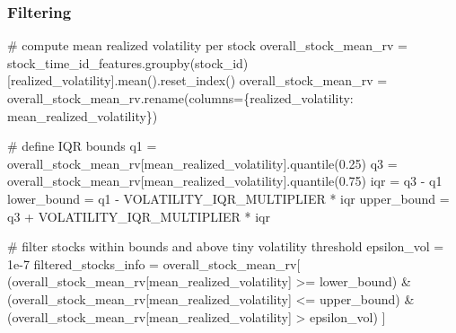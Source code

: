 \documentclass[
  letterpaper,
  DIV=11,
  numbers=noendperiod]{scrartcl}
\newenvironment{Shaded}{\begin{snugshade}}{\end{snugshade}}
\newcommand{\CommentTok}[1]{\textcolor[rgb]{0.37,0.37,0.37}{#1}}
\newcommand{\FloatTok}[1]{\textcolor[rgb]{0.68,0.00,0.00}{#1}}
\newcommand{\NormalTok}[1]{\textcolor[rgb]{0.00,0.23,0.31}{#1}}
\newcommand{\OperatorTok}[1]{\textcolor[rgb]{0.37,0.37,0.37}{#1}}
\newcommand{\StringTok}[1]{\textcolor[rgb]{0.13,0.47,0.30}{#1}}
\begin{document}
\subsubsection{Filtering}\label{filtering}

\begin{Shaded}
\begin{Highlighting}[]
\CommentTok{\# compute mean realized volatility per stock}
\NormalTok{overall\_stock\_mean\_rv }\OperatorTok{=}\NormalTok{ stock\_time\_id\_features.groupby(}\StringTok{\textquotesingle{}stock\_id\textquotesingle{}}\NormalTok{)[}\StringTok{\textquotesingle{}realized\_volatility\textquotesingle{}}\NormalTok{].mean().reset\_index()}
\NormalTok{overall\_stock\_mean\_rv }\OperatorTok{=}\NormalTok{ overall\_stock\_mean\_rv.rename(columns}\OperatorTok{=}\NormalTok{\{}\StringTok{\textquotesingle{}realized\_volatility\textquotesingle{}}\NormalTok{: }\StringTok{\textquotesingle{}mean\_realized\_volatility\textquotesingle{}}\NormalTok{\})}

\CommentTok{\# define IQR bounds}
\NormalTok{q1 }\OperatorTok{=}\NormalTok{ overall\_stock\_mean\_rv[}\StringTok{\textquotesingle{}mean\_realized\_volatility\textquotesingle{}}\NormalTok{].quantile(}\FloatTok{0.25}\NormalTok{)}
\NormalTok{q3 }\OperatorTok{=}\NormalTok{ overall\_stock\_mean\_rv[}\StringTok{\textquotesingle{}mean\_realized\_volatility\textquotesingle{}}\NormalTok{].quantile(}\FloatTok{0.75}\NormalTok{)}
\NormalTok{iqr }\OperatorTok{=}\NormalTok{ q3 }\OperatorTok{{-}}\NormalTok{ q1}
\NormalTok{lower\_bound }\OperatorTok{=}\NormalTok{ q1 }\OperatorTok{{-}}\NormalTok{ VOLATILITY\_IQR\_MULTIPLIER }\OperatorTok{*}\NormalTok{ iqr}
\NormalTok{upper\_bound }\OperatorTok{=}\NormalTok{ q3 }\OperatorTok{+}\NormalTok{ VOLATILITY\_IQR\_MULTIPLIER }\OperatorTok{*}\NormalTok{ iqr}

\CommentTok{\# filter stocks within bounds and above tiny volatility threshold}
\NormalTok{epsilon\_vol }\OperatorTok{=} \FloatTok{1e{-}7}
\NormalTok{filtered\_stocks\_info }\OperatorTok{=}\NormalTok{ overall\_stock\_mean\_rv[}
\NormalTok{    (overall\_stock\_mean\_rv[}\StringTok{\textquotesingle{}mean\_realized\_volatility\textquotesingle{}}\NormalTok{] }\OperatorTok{\textgreater{}=}\NormalTok{ lower\_bound) }\OperatorTok{\&}
\NormalTok{    (overall\_stock\_mean\_rv[}\StringTok{\textquotesingle{}mean\_realized\_volatility\textquotesingle{}}\NormalTok{] }\OperatorTok{\textless{}=}\NormalTok{ upper\_bound) }\OperatorTok{\&}
\NormalTok{    (overall\_stock\_mean\_rv[}\StringTok{\textquotesingle{}mean\_realized\_volatility\textquotesingle{}}\NormalTok{] }\OperatorTok{\textgreater{}}\NormalTok{ epsilon\_vol)}
\NormalTok{]}


\end{Highlighting}
\end{Shaded}
\end{document}
